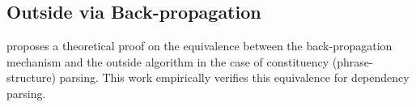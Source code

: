 



\subsection{Outside via Back-propagation}

\citet{eisner-2016-inside} proposes a theoretical proof on the equivalence between
the back-propagation mechanism and the outside algorithm in the case of constituency (phrase-structure) parsing.
This work empirically verifies this equivalence for dependency parsing.

